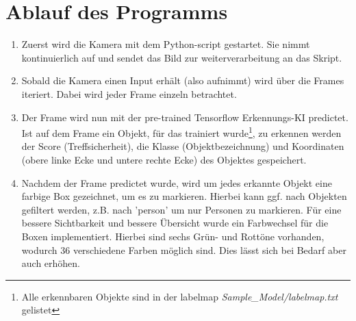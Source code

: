 \documentclass[12pt]{article}
\theoremstyle{definition}
\begin{document}
\section{Ablauf des Programms}

\begin{flushleft}
\begin{enumerate}
\item[Schritt 1:] Zuerst wird die Kamera mit dem Python-script gestartet. Sie nimmt kontinuierlich auf und sendet das Bild zur weiterverarbeitung an das Skript.

\item[Schritt 2:] Sobald die Kamera einen Input erhält (also aufnimmt) wird über die Frames iteriert. Dabei wird jeder Frame einzeln betrachtet.

\item[Schritt 3:] Der Frame wird nun mit der pre-trained Tensorflow Erkennungs-KI predictet. Ist auf dem Frame ein Objekt, für das trainiert wurde\footnote{Alle erkennbaren Objekte sind in der labelmap \textit{Sample\_Model/labelmap.txt} gelistet}, zu erkennen werden der Score (Treffsicherheit), die Klasse (Objektbezeichnung) und Koordinaten (obere linke Ecke und untere rechte Ecke) des Objektes gespeichert.

\item[Schritt 4:] Nachdem der Frame predictet wurde, wird um jedes erkannte Objekt eine farbige Box gezeichnet, um es zu markieren. Hierbei kann ggf. nach Objekten gefiltert werden, z.B. nach 'person' um nur Personen zu markieren. Für eine bessere Sichtbarkeit und bessere Übersicht wurde ein Farbwechsel für die Boxen implementiert. Hierbei sind sechs Grün- und Rottöne vorhanden, wodurch 36 verschiedene Farben möglich sind. Dies lässt sich bei Bedarf aber auch erhöhen.


\end{enumerate}
\end{flushleft}
\end{document}

